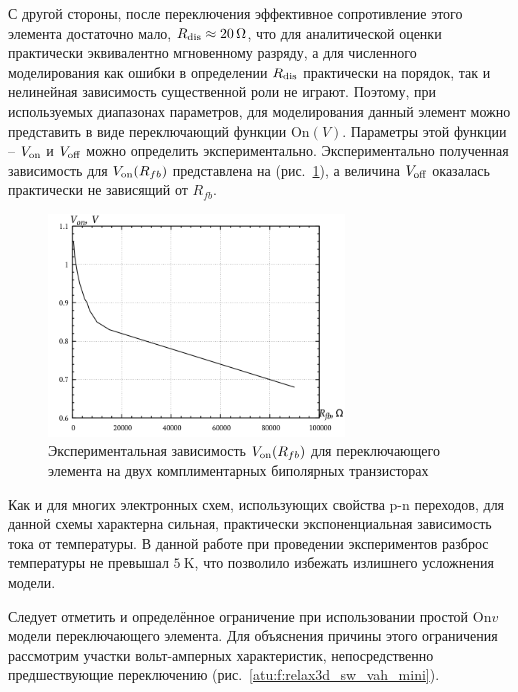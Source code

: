 С другой стороны, после переключения эффективное сопротивление этого элемента
достаточно мало, $R_\mathrm{dis} \approx \SI{20}{\ohm}$,
что для аналитической оценки практически эквивалентно мгновенному разряду,
а для численного моделирования как ошибки в определении $R_\mathrm{dis}$
практически на порядок, так и  нелинейная зависимость существенной роли не играют.
Поэтому, при используемых диапазонах параметров, для моделирования данный элемент можно
представить в виде переключающий функции $\mathrm{On}(V)$.
Параметры этой функции -- $V_\mathrm{on}$ и $V_\mathrm{off}$
можно определить экспериментально. Экспериментально полученная зависимость для $V_\mathrm{on}(R_{fb})$
представлена на (рис.~\ref{atu:f:relax3d_bjt_v_onn}), а величина $V_\mathrm{off}$
оказалась практически не зависящий от $R_{fb}$.

\begin{figure}[htb!]
  \centerline{\includegraphics[width=0.7\textwidth]{p/r_fb-V_on.png} }
  \caption{Экспериментальная зависимость $V_\mathrm{on}(R_{fb})$ для переключающего элемента на двух комплиментарных биполярных транзисторах}
  \label{atu:f:relax3d_bjt_v_onn}
\end{figure}

Как и для многих электронных схем, использующих свойства p-n переходов,
для данной схемы характерна сильная, практически экспоненциальная зависимость
тока от температуры. В данной работе при проведении экспериментов
разброс температуры не превышал $\SI{5}{\kelvin}$, что позволило
избежать излишнего усложнения модели.

Следует отметить и определённое ограничение при использовании
простой $\mathrm{On}{v}$ модели переключающего элемента.
Для объяснения причины этого ограничения
рассмотрим участки вольт-амперных характеристик,
непосредственно предшествующие переключению (рис.~\ref{atu:f:relax3d_sw_vah_mini}).

